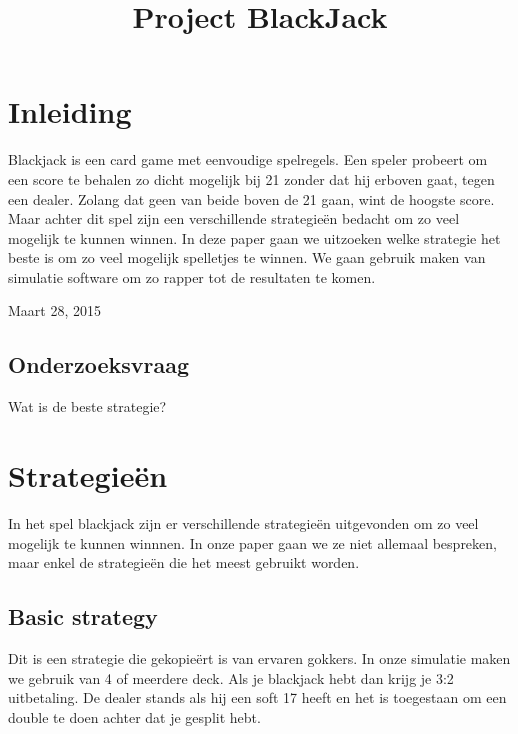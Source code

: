 \documentclass[conference]{IEEEtran}
\begin{document}
\title{Project BlackJack}
\author{
}
\maketitle

\IEEEpeerreviewmaketitle

\section{Inleiding}
Blackjack is een card game met eenvoudige spelregels. Een speler probeert om een score te behalen zo dicht mogelijk bij 21 zonder dat hij erboven gaat, tegen een dealer. Zolang dat geen van beide boven de 21 gaan, wint de hoogste score. Maar achter dit spel zijn een verschillende strategie\"en bedacht om zo veel mogelijk te kunnen winnen. In deze paper gaan we uitzoeken welke strategie het beste is om zo veel mogelijk spelletjes te winnen. We gaan gebruik maken van simulatie software om zo rapper tot de resultaten te komen.
 
\hfill Maart 28, 2015

\subsection{Onderzoeksvraag}
Wat is de beste strategie?



\section{Strategie\"en}
In het spel blackjack zijn er verschillende strategie\"en uitgevonden om zo veel mogelijk te kunnen winnnen. In onze paper gaan we ze niet allemaal bespreken, maar enkel de strategie\"en die het meest gebruikt worden.


\subsection{Basic strategy}

Dit is een strategie die gekopie\"ert is van ervaren gokkers. In onze simulatie maken we gebruik van 4 of meerdere deck. Als je blackjack hebt dan krijg je 3:2 uitbetaling. De dealer stands als hij een soft 17 heeft en het is toegestaan om een double te doen achter dat je gesplit hebt. 
\end{document}
